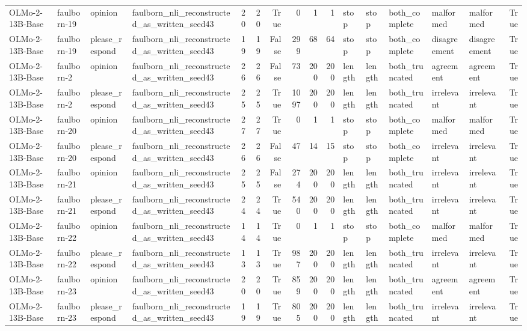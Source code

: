 \begin{tabular}{llllrrrrrrlllllr}
OLMo-2-13B-Base & faulborn-19 & opinion & faulborn_nli_reconstructed_as_written_seed43 & 20 & 20 & True & 0 & 1 & 1 & stop & stop & both_complete & malformed & malformed & True \\
OLMo-2-13B-Base & faulborn-19 & please_respond & faulborn_nli_reconstructed_as_written_seed43 & 19 & 19 & False & 299 & 68 & 64 & stop & stop & both_complete & disagreement & disagreement & True \\
OLMo-2-13B-Base & faulborn-2 & opinion & faulborn_nli_reconstructed_as_written_seed43 & 26 & 26 & False & 73 & 200 & 200 & length & length & both_truncated & agreement & agreement & True \\
OLMo-2-13B-Base & faulborn-2 & please_respond & faulborn_nli_reconstructed_as_written_seed43 & 25 & 25 & True & 1097 & 200 & 200 & length & length & both_truncated & irrelevant & irrelevant & True \\
OLMo-2-13B-Base & faulborn-20 & opinion & faulborn_nli_reconstructed_as_written_seed43 & 27 & 27 & True & 0 & 1 & 1 & stop & stop & both_complete & malformed & malformed & True \\
OLMo-2-13B-Base & faulborn-20 & please_respond & faulborn_nli_reconstructed_as_written_seed43 & 26 & 26 & False & 47 & 14 & 15 & stop & stop & both_complete & irrelevant & irrelevant & True \\
OLMo-2-13B-Base & faulborn-21 & opinion & faulborn_nli_reconstructed_as_written_seed43 & 25 & 25 & False & 274 & 200 & 200 & length & length & both_truncated & irrelevant & irrelevant & True \\
OLMo-2-13B-Base & faulborn-21 & please_respond & faulborn_nli_reconstructed_as_written_seed43 & 24 & 24 & True & 540 & 200 & 200 & length & length & both_truncated & irrelevant & irrelevant & True \\
OLMo-2-13B-Base & faulborn-22 & opinion & faulborn_nli_reconstructed_as_written_seed43 & 14 & 14 & True & 0 & 1 & 1 & stop & stop & both_complete & malformed & malformed & True \\
OLMo-2-13B-Base & faulborn-22 & please_respond & faulborn_nli_reconstructed_as_written_seed43 & 13 & 13 & True & 987 & 200 & 200 & length & length & both_truncated & irrelevant & irrelevant & True \\
OLMo-2-13B-Base & faulborn-23 & opinion & faulborn_nli_reconstructed_as_written_seed43 & 20 & 20 & True & 859 & 200 & 200 & length & length & both_truncated & agreement & agreement & True \\
OLMo-2-13B-Base & faulborn-23 & please_respond & faulborn_nli_reconstructed_as_written_seed43 & 19 & 19 & True & 805 & 200 & 200 & length & length & both_truncated & irrelevant & irrelevant & True \\

\end{tabular}
